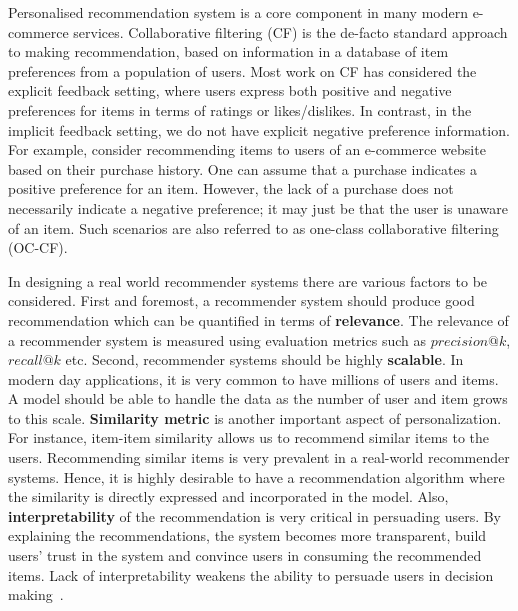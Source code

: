 Personalised recommendation system is a core component
in many modern e-commerce services. Collaborative
filtering (CF) is the de-facto standard approach to making recommendation,
based on information in a database
of item preferences from a population of users. Most work on CF has considered 
the explicit feedback
setting, where users express both positive and negative preferences
for items in terms of ratings or likes/dislikes. In
contrast, in the implicit feedback setting, we do not have
explicit negative preference information. For example, consider
recommending items to users of an e-commerce website
based on their purchase history. One can assume that a
purchase indicates a positive preference for an item. However,
the lack of a purchase does not necessarily indicate
a negative preference; it may just be that the user is unaware
of an item. Such scenarios are also referred to as one-class collaborative
filtering (OC-CF).



In designing a real world recommender systems there are various factors to be 
considered. First and foremost, a recommender system should  produce good recommendation which can be quantified in terms of \textbf{relevance}. The relevance of a recommender system is measured using evaluation metrics such as $precision@k$, $recall@k$ etc. Second, recommender systems should be highly \textbf{scalable}. In modern day applications, it is very common to have millions of users and items. A model should be able to handle the data as the number of user and item grows to this scale. \textbf{Similarity metric} is another important aspect of personalization. For instance, item-item similarity allows us to recommend similar items to the users. Recommending similar items is very prevalent in a real-world recommender systems. Hence, it is highly desirable to have a recommendation algorithm where the similarity is directly expressed and incorporated in the model. Also, \textbf{interpretability} of the recommendation is very critical in persuading users. By explaining the recommendations, the system becomes more transparent, build users' trust in the system and convince users in consuming the recommended items. Lack of interpretability weakens the ability to persuade users in decision making~\citep{explainabiltyVIG2009}.


